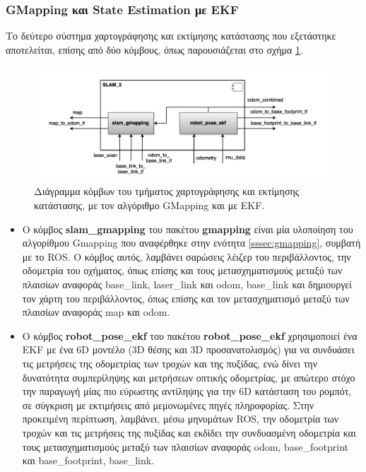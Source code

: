 \subsubsection{GMapping και State Estimation με EKF}
Το δεύτερο σύστημα χαρτογράφησης και εκτίμησης κατάστασης που εξετάστηκε αποτελείται, επίσης από δύο κόμβους, όπως παρουσιάζεται στο σχήμα \ref{fig:slam_2_component_diagram}.

\begin{figure}[!ht]
	\centering
	\includegraphics[width=\linewidth]{Chapters/Chapter4/Figures/slam_2_component_diagram.png}
	\caption{Διάγραμμα κόμβων του τμήματος χαρτογράφησης και εκτίμησης κατάστασης, με τον αλγόριθμο GMapping και με EKF.}
	\label{fig:slam_2_component_diagram}
\end{figure}

\begin{itemize}
		\item Ο κόμβος \textbf{slam{\_}gmapping} του πακέτου \textbf{gmapping} \cite{gmapping_package} είναι μία υλοποίηση του αλγορίθμου Gmapping που αναφέρθηκε στην ενότητα \ref{sssec:gmapping}, συμβατή με το ROS. Ο κόμβος αυτός, λαμβάνει σαρώσεις λέιζερ του περιβάλλοντος, την οδομετρία του οχήματος, όπως επίσης και τους μετασχηματισμούς μεταξύ των πλαισίων αναφοράς base{\_}link, laser{\_}link και odom, base{\_}link και δημιουργεί τον χάρτη του περιβάλλοντος, όπως επίσης και τον μετασχηματισμό μεταξύ των πλαισίων αναφοράς map και odom.
		\item Ο κόμβος \textbf{robot{\_}pose{\_}ekf} του πακέτου \textbf{robot{\_}pose{\_}ekf} \cite{robot_pose_ekf} χρησιμοποιεί ένα EKF με ένα 6D μοντέλο (3D θέσης και 3D προσανατολισμός) για να συνδυάσει τις μετρήσεις της οδομετρίας των τροχών και της πυξίδας, ενώ δίνει την δυνατότητα συμπερίληψης και μετρήσεων οπτικής οδομετρίας, με απώτερο στόχο την παραγωγή μίας πιο εύρωστης αντίληψης για την 6D κατάσταση του ρομπότ, σε σύγκριση με εκτιμήσεις από μεμονωμένες πηγές πληροφορίας. Στην προκειμένη περίπτωση, λαμβάνει, μέσω μηνυμάτων ROS, την οδομετρία των τροχών και τις μετρήσεις της πυξίδας και εκδίδει την συνδυασμένη οδομετρία και τους μετασχηματισμούς μεταξύ των πλαισίων αναφοράς odom, base{\_}footprint και base{\_}footprint, base{\_}link.

\end{itemize}


